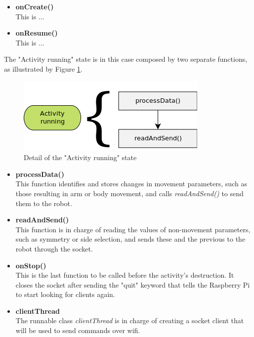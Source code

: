	\begin{itemize}

	\item \textbf{onCreate()} \hfill \\
	This is ...\\

	\item \textbf{onResume()} \hfill \\
	This is ...


	\end{itemize}

\bigskip

The "Activity running" state is in this case composed by two separate functions, as illustrated by Figure \ref{activityDetail}.

	\begin{figure}[H]
      \centering
      \includegraphics[scale=.8]{images/Diagrams/androidActivity.png}
      \caption{Detail of the "Activity running" state}
      \label{activityDetail}
	\end{figure}

\bigskip

	\begin{itemize}

	\item \textbf{processData()} \hfill \\
	This function identifies and stores changes in movement parameters, such as those resulting in arm or body movement, and calls \textit{readAndSend()} to send them to the robot.\\

	\item \textbf{readAndSend()} \hfill \\
	This function is in charge of reading the values of non-movement parameters, such as symmetry or side selection, and sends these and the previous to the robot through the socket.\\

	\item \textbf{onStop()} \hfill \\
	This is the last function to be called before the activity's destruction. It closes the socket after sending the "quit" keyword that tells the Raspberry Pi to start looking for clients again. \\

	\item \textbf{clientThread} \hfill \\
	The runnable class \textit{clientThread} is in charge of creating a socket client that will be used to send commands over wifi.\\

	\end{itemize}

\bigskip
